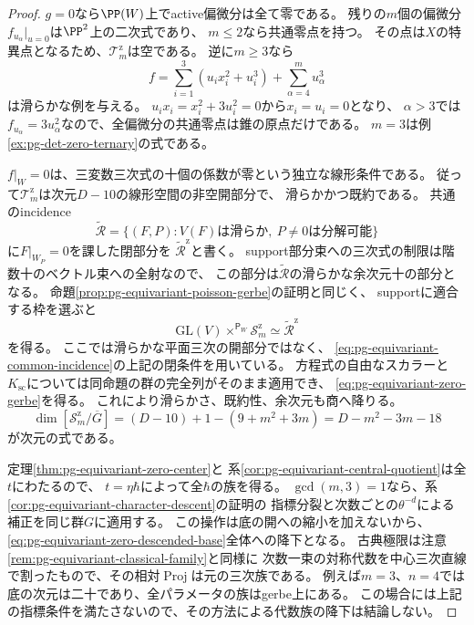 \begin{proof}
$g=0$なら$\PP(W)$上でactive偏微分は全て零である。
残りの$m$個の偏微分$f_{u_\alpha}|_{u=0}$は$\PP^2$上の二次式であり、
$m\le2$なら共通零点を持つ。
その点は$X$の特異点となるため、$\mathcal T_m^{\mathrm z}$は空である。
逆に$m\ge3$なら
\begin{equation}
 f=\sum_{i=1}^3(u_ix_i^2+u_i^3)+\sum_{\alpha=4}^m u_\alpha^3
 \label{eq:pg-equivariant-zero-smooth-example}
\end{equation}
は滑らかな例を与える。
$u_ix_i=x_i^2+3u_i^2=0$から$x_i=u_i=0$となり、
$\alpha>3$では$f_{u_\alpha}=3u_\alpha^2$なので、全偏微分の共通零点は錐の原点だけである。
$m=3$は例\ref{ex:pg-det-zero-ternary}の式である。

$f|_W=0$は、三変数三次式の十個の係数が零という独立な線形条件である。
従って$\mathcal T_m^{\mathrm z}$は次元$D-10$の線形空間の非空開部分で、
滑らかかつ既約である。
共通のincidence
\begin{equation}
 \widetilde{\mathscr R}
 =\{(F,P):V(F)\text{は滑らか},\ P\ne0\text{は分解可能}\}
 \label{eq:pg-equivariant-common-incidence}
\end{equation}
に$F|_{W_P}=0$を課した閉部分を
$\widetilde{\mathscr R}^{\mathrm z}$と書く。
support部分束への三次式の制限は階数十のベクトル束への全射なので、
この部分は$\widetilde{\mathscr R}$の滑らかな余次元十の部分となる。
命題\ref{prop:pg-equivariant-poisson-gerbe}の証明と同じく、
supportに適合する枠を選ぶと
\begin{equation}
 \mathrm{GL}(V)\times^{\mathsf P_W}\mathscr S_m^{\mathrm z}
 \simeq\widetilde{\mathscr R}^{\mathrm z}
 \label{eq:pg-equivariant-zero-associated-incidence}
\end{equation}
を得る。
ここでは滑らかな平面三次の開部分ではなく、
\eqref{eq:pg-equivariant-common-incidence}の上記の閉条件を用いている。
方程式の自由なスカラーと$K_{\mathrm{sc}}$については同命題の群の完全列がそのまま適用でき、
\eqref{eq:pg-equivariant-zero-gerbe}を得る。
これにより滑らかさ、既約性、余次元も商へ降りる。
\begin{equation}
 \dim[\mathscr S_m^{\mathrm z}/\overline G]
 =(D-10)+1-(9+m^2+3m)=D-m^2-3m-18
 \label{eq:pg-equivariant-zero-dimension-count}
\end{equation}
が次元の式である。

定理\ref{thm:pg-equivariant-zero-center}と
系\ref{cor:pg-equivariant-central-quotient}は全$t$にわたるので、
$t=\eta\hbar$によって全$\hbar$の族を得る。
$\gcd(m,3)=1$なら、系\ref{cor:pg-equivariant-character-descent}の証明の
指標分裂と次数ごとの$\theta^{-d}$による補正を同じ群$G$に適用する。
この操作は底の開への縮小を加えないから、
\eqref{eq:pg-equivariant-zero-descended-base}全体への降下となる。
古典極限は注意\ref{rem:pg-equivariant-classical-family}と同様に
次数一束の対称代数を中心三次直線で割ったもので、その相対$\operatorname{Proj}$は元の三次族である。
例えば$m=3$、$n=4$では底の次元は二十であり、全パラメータの族はgerbe上にある。
この場合には上記の指標条件を満たさないので、その方法による代数族の降下は結論しない。
\end{proof}

